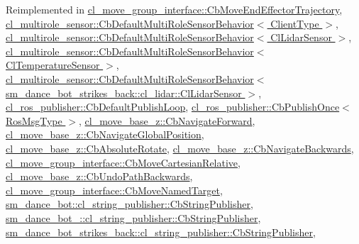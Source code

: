 Reimplemented in \hyperlink{classcl__move__group__interface_1_1CbMoveEndEffectorTrajectory_a4952c092e69bc6e9831568de32888da5}{cl\+\_\+move\+\_\+group\+\_\+interface\+::\+Cb\+Move\+End\+Effector\+Trajectory}, \hyperlink{classcl__multirole__sensor_1_1CbDefaultMultiRoleSensorBehavior_a0f400c7e29d0cb1dda11242a5a922f4c}{cl\+\_\+multirole\+\_\+sensor\+::\+Cb\+Default\+Multi\+Role\+Sensor\+Behavior$<$ Client\+Type $>$}, \hyperlink{classcl__multirole__sensor_1_1CbDefaultMultiRoleSensorBehavior_a0f400c7e29d0cb1dda11242a5a922f4c}{cl\+\_\+multirole\+\_\+sensor\+::\+Cb\+Default\+Multi\+Role\+Sensor\+Behavior$<$ Cl\+Lidar\+Sensor $>$}, \hyperlink{classcl__multirole__sensor_1_1CbDefaultMultiRoleSensorBehavior_a0f400c7e29d0cb1dda11242a5a922f4c}{cl\+\_\+multirole\+\_\+sensor\+::\+Cb\+Default\+Multi\+Role\+Sensor\+Behavior$<$ Cl\+Temperature\+Sensor $>$}, \hyperlink{classcl__multirole__sensor_1_1CbDefaultMultiRoleSensorBehavior_a0f400c7e29d0cb1dda11242a5a922f4c}{cl\+\_\+multirole\+\_\+sensor\+::\+Cb\+Default\+Multi\+Role\+Sensor\+Behavior$<$ sm\+\_\+dance\+\_\+bot\+\_\+strikes\+\_\+back\+::cl\+\_\+lidar\+::\+Cl\+Lidar\+Sensor $>$}, \hyperlink{classcl__ros__publisher_1_1CbDefaultPublishLoop_a206c6bc09e7c6414304b679ec415c19f}{cl\+\_\+ros\+\_\+publisher\+::\+Cb\+Default\+Publish\+Loop}, \hyperlink{classcl__ros__publisher_1_1CbPublishOnce_ad82cb7d6ac69fe9b91bc955550ab92cb}{cl\+\_\+ros\+\_\+publisher\+::\+Cb\+Publish\+Once$<$ Ros\+Msg\+Type $>$}, \hyperlink{classcl__move__base__z_1_1CbNavigateForward_a2160484562ef5fb1c655fab7f990241e}{cl\+\_\+move\+\_\+base\+\_\+z\+::\+Cb\+Navigate\+Forward}, \hyperlink{classcl__move__base__z_1_1CbNavigateGlobalPosition_a5c18268af1e7fc236aa155a58345d5d7}{cl\+\_\+move\+\_\+base\+\_\+z\+::\+Cb\+Navigate\+Global\+Position}, \hyperlink{classcl__move__base__z_1_1CbAbsoluteRotate_a0e362b8e9f0d7de5aeee183ba4031437}{cl\+\_\+move\+\_\+base\+\_\+z\+::\+Cb\+Absolute\+Rotate}, \hyperlink{classcl__move__base__z_1_1CbNavigateBackwards_a92858e20e6401051203f5dfa4aef60dc}{cl\+\_\+move\+\_\+base\+\_\+z\+::\+Cb\+Navigate\+Backwards}, \hyperlink{classcl__move__group__interface_1_1CbMoveCartesianRelative_a4ec79f1b62ddd8ecabf1f63aabb69013}{cl\+\_\+move\+\_\+group\+\_\+interface\+::\+Cb\+Move\+Cartesian\+Relative}, \hyperlink{classcl__move__base__z_1_1CbUndoPathBackwards_a20cee921ad92db16f8d17c3c3b9c2daf}{cl\+\_\+move\+\_\+base\+\_\+z\+::\+Cb\+Undo\+Path\+Backwards}, \hyperlink{classcl__move__group__interface_1_1CbMoveNamedTarget_ae7e89742c903577b71790370714047d8}{cl\+\_\+move\+\_\+group\+\_\+interface\+::\+Cb\+Move\+Named\+Target}, \hyperlink{classsm__dance__bot_1_1cl__string__publisher_1_1CbStringPublisher_ac93cc1eb150140331cb3e560ec8249e2}{sm\+\_\+dance\+\_\+bot\+::cl\+\_\+string\+\_\+publisher\+::\+Cb\+String\+Publisher}, \hyperlink{classsm__dance__bot__2_1_1cl__string__publisher_1_1CbStringPublisher_aee990acdb5ec33f1d22efafbe32216f2}{sm\+\_\+dance\+\_\+bot\+\_\+::cl\+\_\+string\+\_\+publisher\+::\+Cb\+String\+Publisher}, \hyperlink{classsm__dance__bot__strikes__back_1_1cl__string__publisher_1_1CbStringPublisher_ae4aa02553119822c583bb2abb44c810c}{sm\+\_\+dance\+\_\+bot\+\_\+strikes\+\_\+back\+::cl\+\_\+string\+\_\+publisher\+::\+Cb\+String\+Publisher}, 